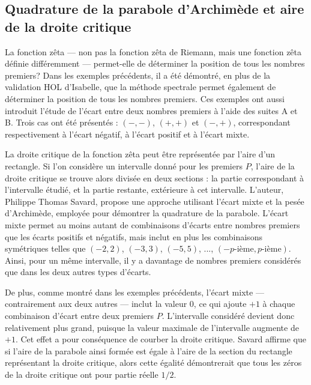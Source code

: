 \documentclass[a4paper,11pt]{article}
\begin{document}
\begin{tcolorbox}[colback=white,colframe=black,title={Quadrature de la parabole et zéros critiques}]
\section*{Quadrature de la parabole d'Archimède et aire de la droite critique}

La fonction zêta — non pas la fonction zêta de Riemann, mais une fonction zêta définie différemment — permet-elle de déterminer la position de tous les nombres premiers? Dans les exemples précédents, il a été démontré, en plus de la validation HOL d'Isabelle, que la méthode spectrale permet également de déterminer la position de tous les nombres premiers. Ces exemples ont aussi introduit l'étude de l'écart entre deux nombres premiers à l’aide des suites A et B. Trois cas ont été présentés : $(-,-)$, $(+,+)$ et $(-,+)$, correspondant respectivement à l'écart négatif, à l'écart positif et à l'écart mixte.

La droite critique de la fonction zêta peut être représentée par l'aire d'un rectangle. Si l'on considère un intervalle donné pour les premiers $P$, l'aire de la droite critique se trouve alors divisée en deux sections : la partie correspondant à l'intervalle étudié, et la partie restante, extérieure à cet intervalle. L'auteur, Philippe Thomas Savard, propose une approche utilisant l'écart mixte et la pesée d'Archimède, employée pour démontrer la quadrature de la parabole. L'écart mixte permet au moins autant de combinaisons d'écarts entre nombres premiers que les écarts positifs et négatifs, mais inclut en plus les combinaisons symétriques telles que $(-2,2)$, $(-3,3)$, $(-5,5)$, ..., $(-p\text{-ième}, p\text{-ième})$. Ainsi, pour un même intervalle, il y a davantage de nombres premiers considérés que dans les deux autres types d’écarts.

De plus, comme montré dans les exemples précédents, l'écart mixte — contrairement aux deux autres — inclut la valeur $0$, ce qui ajoute $+1$ à chaque combinaison d'écart entre deux premiers $P$. L'intervalle considéré devient donc relativement plus grand, puisque la valeur maximale de l'intervalle augmente de $+1$. Cet effet a pour conséquence de courber la droite critique. Savard affirme que si l'aire de la parabole ainsi formée est égale à l’aire de la section du rectangle représentant la droite critique, alors cette égalité démontrerait que tous les zéros de la droite critique ont pour partie réelle $1/2$.


\end{tcolorbox}
\end{document}
